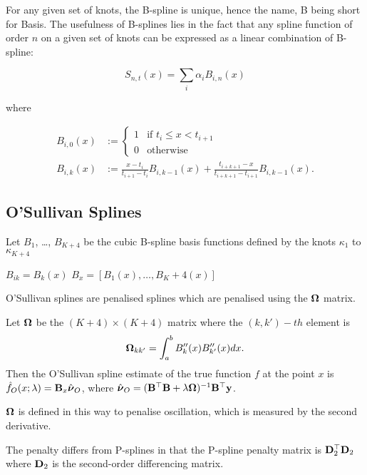 \documentclass{amsart}[12pt]
\begin{document}
For any given set of knots, the B-spline is unique, hence the name, B being short for Basis. The usefulness
of B-splines lies in the fact that any spline function of order $n$ on a given set of knots can be expressed
as a linear combination of B-spline:

$$
S_{n, t}(x) = \sum_i \alpha_i B_{i, n}(x)
$$

where

\begin{align*}
	B_{i, 0}(x) & := \begin{cases}                                                                                                        
	1           & \text{if } t_i \leq x < t_{i+1}                                                                                         \\
	0           & \text{otherwise}                                                                                                        
	\end{cases} \\
	B_{i, k}(x) & := \frac{x - t_i}{t_{i + 1} - t_i} B_{i, k-1} (x) + \frac{t_{i + k + 1} - x}{t_{i + k + 1} - t_{i + 1}} B_{i, k-1} (x). 
\end{align*}

\subsection{O'Sullivan Splines}

Let $B_1$, \ldots, $B_{K+4}$ be the cubic B-spline basis functions defined by the knots $\kappa_1$ to
$\kappa_{K+4}$

$B_{ik} = B_k (x)$
$B_x = [B_1(x), \ldots, B_K+4(x)]$

O'Sullivan splines are penalised splines which are penalised using the ${\boldsymbol \Omega}$ matrix.

Let ${\boldsymbol \Omega}$ be the $(K+4) \times (K+4)$ matrix where the $(k, k')-th$ element is
\[
	{\boldsymbol \Omega}_{k k'} = \int_a^b B''_k(x) B''_{k'}(x) dx.
\]
Then the O'Sullivan spline estimate of the true function $f$ at the point $x$ is
$\hat{f}_O(x; \lambda) = {\bf B}_x \hat{{\boldsymbol \nu}}_O$, where
$\hat{{\boldsymbol \nu}}_O = ({\bf B}^\top {\bf B} + \lambda {\boldsymbol\Omega})^{-1} {\bf B}^\top {\bf y}$.

${\boldsymbol \Omega}$ is defined in this way to penalise oscillation, which is measured by the second derivative.

The penalty differs from P-splines in that the P-spline penalty matrix is ${\bf D}_2^\top {\bf D}_2$ where ${\bf D}_2$ is
the second-order differencing matrix.
\end{document}
